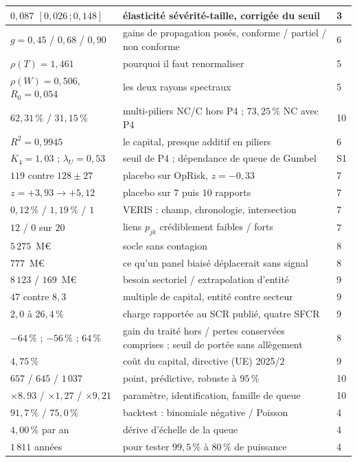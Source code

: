 \begin{longtable}{@{}p{5.0cm}p{9.2cm}p{1.1cm}@{}}
$0{,}087$ $[0{,}026\,;0{,}148]$ & élasticité sévérité-taille, corrigée du seuil & 3 \\
\midrule
$g=0{,}45$ / $0{,}68$ / $0{,}90$ & gains de propagation posés, conforme / partiel / non conforme & 6 \\
$\rho(T)=1{,}461$ & pourquoi il faut renormaliser & 5 \\
$\rho(W)=0{,}506$, $R_0=0{,}054$ & les deux rayons spectraux & 5 \\
$62{,}31\,\%$ / $31{,}15\,\%$ & multi-piliers NC/C hors P4 ; $73{,}25\,\%$ NC avec P4 & 10 \\
$R^2=0{,}9945$ & le capital, presque additif en piliers & 6 \\
$K_4=1{,}03$ ; $\lambda_U=0{,}53$ & seuil de P4 ; dépendance de queue de Gumbel & S1 \\
\midrule
$119$ contre $128\pm27$ & placebo sur OpRisk, $z=-0{,}33$ & 7 \\
$z=+3{,}93\to+5{,}12$ & placebo sur $7$ puis $10$ rapports & 7 \\
$0{,}12\,\%$ / $1{,}19\,\%$ / $1$ & VERIS : champ, chronologie, intersection & 7 \\
$12$ / $0$ sur $20$ & liens $p_{jk}$ crédiblement faibles / forts & 7 \\
$5\,275$~M\euro & socle sans contagion & 8 \\
$777$~M\euro & ce qu'un panel biaisé déplacerait sans signal & 8 \\
\midrule
$8\,123$ / $169$~M\euro & besoin sectoriel / extrapolation d'entité & 9 \\
$47$ contre $8{,}3$ & multiple de capital, entité contre secteur & 9 \\
$2{,}0$ à $26{,}4\,\%$ & charge rapportée au SCR publié, quatre SFCR & 9 \\
$-64\,\%$ ; $-56\,\%$ ; $64\,\%$ & gain du traité hors / pertes conservées comprises ; seuil de portée sans allègement & 8 \\
$4{,}75\,\%$ & coût du capital, directive (UE) 2025/2 & 9 \\
$657$ / $645$ / $1\,037$ & point, prédictive, robuste à $95\,\%$ & 10 \\
$\times8{,}93$ / $\times1{,}27$ / $\times9{,}21$ & paramètre, identification, famille de queue & 10 \\
$91{,}7\,\%$ / $75{,}0\,\%$ & backtest : binomiale négative / Poisson & 4 \\
$4{,}00\,\%$ par an & dérive d'échelle de la queue & 4 \\
$1\,811$ années & pour tester $99{,}5\,\%$ à $80\,\%$ de puissance & 4 \\

\end{longtable}
